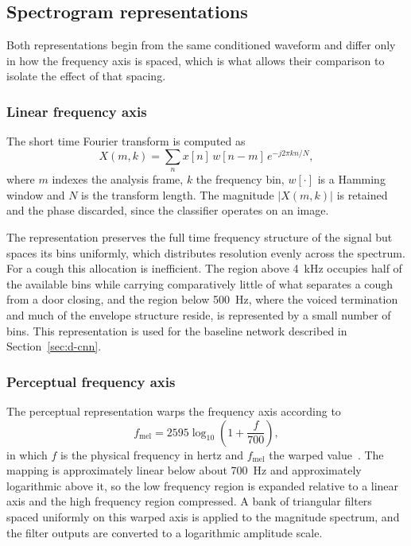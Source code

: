 \documentclass[pdflatex,sn-mathphys-num]{sn-jnl}
\begin{document}
\subsection{Spectrogram representations}\label{sec:d-spec}

Both representations begin from the same conditioned waveform and differ only
in how the frequency axis is spaced, which is what allows their comparison to
isolate the effect of that spacing.

\subsubsection{Linear frequency axis}\label{sec:d-stft}

The short time Fourier transform is computed as
\begin{equation}
X(m, k) = \sum_{n} x[n]\, w[n - m]\, e^{-j 2 \pi k n / N},
\label{eq:stft}
\end{equation}
where $m$ indexes the analysis frame, $k$ the frequency bin, $w[\cdot]$ is a
Hamming window and $N$ is the transform length. The magnitude $|X(m,k)|$ is
retained and the phase discarded, since the classifier operates on an image.

The representation preserves the full time frequency structure of the signal
but spaces its bins uniformly, which distributes resolution evenly across the
spectrum. For a cough this allocation is inefficient. The region above 4~kHz
occupies half of the available bins while carrying comparatively little of
what separates a cough from a door closing, and the region below 500~Hz, where
the voiced termination and much of the envelope structure reside, is
represented by a small number of bins. This representation is used for the
baseline network described in Section~\ref{sec:d-cnn}.

\subsubsection{Perceptual frequency axis}\label{sec:d-mel}

The perceptual representation warps the frequency axis according to
\begin{equation}
f_{\mathrm{mel}} = 2595 \log_{10}\!\left(1 + \frac{f}{700}\right),
\label{eq:mel}
\end{equation}
in which $f$ is the physical frequency in hertz and $f_{\mathrm{mel}}$ the
warped value~\cite{davis1980}. The mapping is approximately linear below
about 700~Hz and approximately logarithmic above it, so the low frequency
region is expanded relative to a linear axis and the high frequency region
compressed. A bank of triangular filters spaced uniformly on this warped axis
is applied to the magnitude spectrum, and the filter outputs are converted to
a logarithmic amplitude scale.
\end{document}
